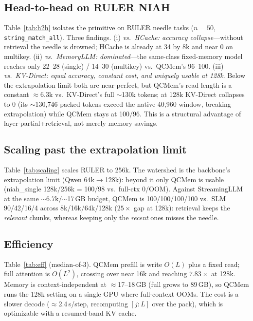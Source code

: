 \documentclass[11pt]{article}
\begin{document}


\subsection{Head-to-head on RULER NIAH}
Table~\ref{tab:h2h} isolates the primitive on RULER needle tasks ($n{=}50$,
\texttt{string\_match\_all}). Three findings. (i) \emph{vs.\ HCache: accuracy
collapse}---without retrieval the needle is drowned; HCache is already at 34 by
8k and near 0 on multikey. (ii) \emph{vs.\ MemoryLLM: dominated}---the
same-class fixed-memory model reaches only 22--28 (single) / 14--30 (multikey)
vs.\ QCMem's 96--100. (iii) \emph{vs.\ KV-Direct: equal accuracy, constant
cost, and uniquely usable at 128k}. Below the extrapolation limit both are
near-perfect, but QCMem's read length is a constant $\approx$6.3k vs.\
KV-Direct's full $\sim$130k tokens; at 128k KV-Direct collapses to 0 (its
$\sim$130{,}746 packed tokens exceed the native 40{,}960 window, breaking
extrapolation) while QCMem stays at 100/96. This is a structural advantage of
layer-partial{+}retrieval, not merely memory savings.



\subsection{Scaling past the extrapolation limit}
Table~\ref{tab:scaling} scales RULER to 256k. The watershed is the backbone's
extrapolation limit (Qwen 64k$\to$128k): beyond it only QCMem is usable
(niah\_single 128k/256k = 100/98 vs.\ full-ctx 0/OOM). Against StreamingLLM at
the same $\sim$6.7k/$\sim$17\,GB budget, QCMem is 100/100/100/100 vs.\ SLM
90/42/16/4 across 8k/16k/64k/128k ($25\times$ gap at 128k): retrieval keeps the
\emph{relevant} chunks, whereas keeping only the \emph{recent} ones misses the
needle.



\subsection{Efficiency}
Table~\ref{tab:eff} (median-of-3). QCMem prefill is write $O(L)$ plus a fixed
read; full attention is $O(L^2)$, crossing over near 16k and reaching
$7.83\times$ at 128k. Memory is context-independent at $\approx$17--18\,GB
(full grows to 89\,GB), so QCMem runs the 128k setting on a single GPU where
full-context OOMs. The cost is a slower decode ($\approx$2.4\,s/step,
recomputing $[j{:}L]$ over the pack), which is optimizable with a resumed-band
KV cache.
\end{document}
